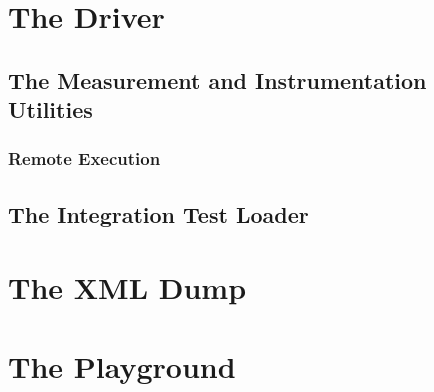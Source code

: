 \section{The Driver} \label{sec:Driver}
\subsection{The Measurement and Instrumentation Utilities}
\label{sec:Driver.MeasureAndInstrument}
\subsubsection{Remote Execution}
\subsection{The Integration Test Loader}

\section{The XML Dump}
\section{The Playground}
